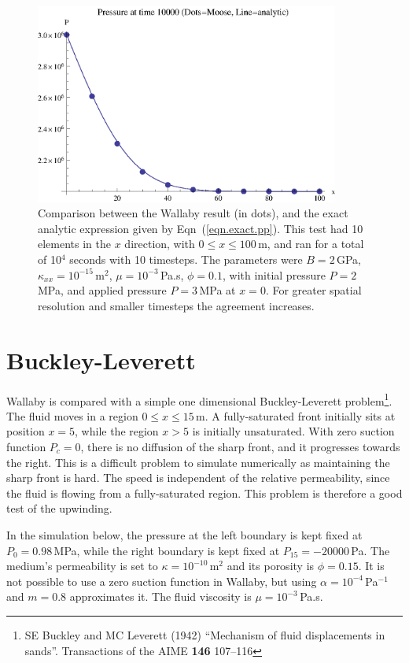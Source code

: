 \documentclass[]{scrreprt}
\begin{document}
\begin{figure}[htb]
\centering
\includegraphics[width=10cm]{pressure_pulse.eps}
\caption{Comparison between the Wallaby result (in dots), and the
  exact analytic expression given by Eqn~(\ref{eqn.exact.pp}).  This
  test had 10 elements in the $x$ direction, with $0\leq x \leq
  100$\,m, and ran for a total of 
  10$^4$ seconds with 10 timesteps.  The parameters were $B=2$\,GPa,
  $\kappa_{xx}=10^{-15}$\,m$^{2}$, $\mu=10^{-3}$\,Pa.s, $\phi=0.1$,
  with initial pressure $P=2$\,MPa, and applied pressure $P=3$\,MPa at
  $x=0$.  For greater spatial resolution and smaller timesteps the
  agreement increases.}
\label{pressure_pulse.fig}
\end{figure}


\chapter{Buckley-Leverett}

Wallaby is compared with a simple one dimensional
Buckley-Leverett problem\footnote{SE Buckley and MC Leverett (1942)
  ``Mechanism of fluid displacements in sands''.  Transactions of the
  AIME {\bf 146} 107--116}.  The fluid moves in a region $0\leq x\leq
15$\,m.  A fully-saturated front initially sits at position $x=5$,
while the region $x>5$ is initially unsaturated.  With zero suction
function $P_{c} = 0$, there is no diffusion of the sharp front, and it
progresses towards the right.  This is a difficult problem to simulate
numerically as maintaining the sharp front is hard.  The speed is
independent of the 
relative permeability, since the fluid is flowing from a
fully-saturated region.  This problem is therefore a good test of the upwinding.


In the simulation below, the pressure at the left boundary is kept
fixed at $P_{0}=0.98$\,MPa, while the right boundary is kept fixed at
$P_{15}=-20000$\,Pa.  The medium's permeability is set to $\kappa =
10^{-10}\,\mathrm{m}^{2}$ and its porosity is $\phi = 0.15$.  It is
not possible to use a zero suction function in Wallaby, but using
$\alpha = 10^{-4}$\,Pa$^{-1}$ and $m=0.8$ approximates it.  The fluid
viscosity is $\mu = 10^{-3}$\,Pa.s.
\end{document}
